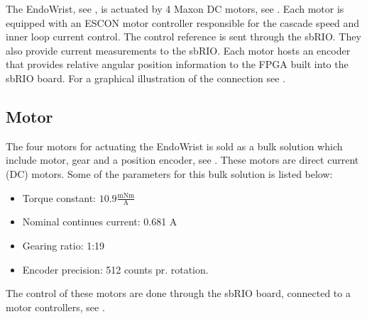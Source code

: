 The EndoWrist, see , is actuated by 4 Maxon DC motors, see . Each motor is equipped with an ESCON motor controller responsible for the cascade speed and inner loop current control. The control reference is sent through the sbRIO. They also provide current measurements to the sbRIO. Each motor hosts an encoder that provides relative angular position information to the FPGA built into the sbRIO board. For a graphical illustration of the connection see .


\subsection{Motor}\label{Maxon_Motor}
The four motors for actuating the EndoWrist is sold as a bulk solution which include motor\cite{motor_motor}, gear\cite{motor_gear} and a position encoder\cite{motor_encoder}, see .
These motors are direct current (DC) motors. Some of the parameters for this bulk solution is listed below:

\begin{itemize}
\item Torque constant: $10.9\frac{\text{mNm}}{\text{A}}$
\item Nominal continues current: 0.681 A 
\item Gearing ratio: 1:19
\item Encoder precision: 512 counts pr. rotation.
\end{itemize}

The control of these motors are done through the sbRIO board, connected to a motor controllers, see .

